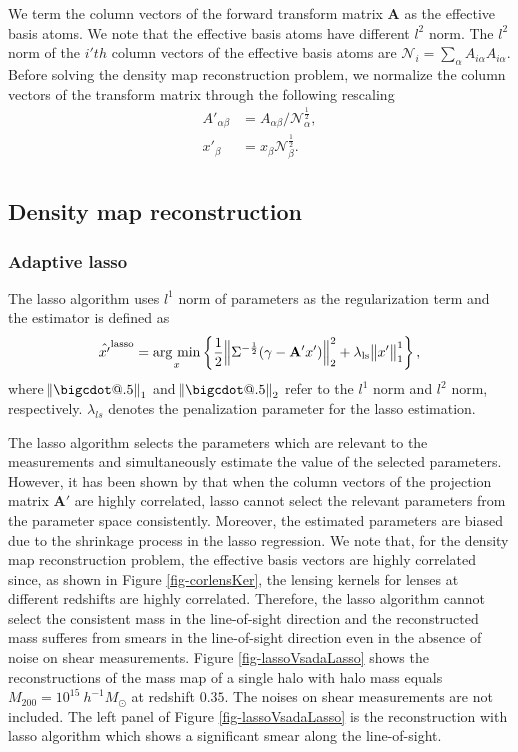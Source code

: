 \documentclass[twocolumn]{aastex62}
\makeatletter
\newcommand*\bigcdot{\mathpalette\bigcdot@{.5}}
\newcommand*\bigcdot@[2]{\mathbin{\vcenter{\hbox{\scalebox{#2}{$\m@th#1\bullet$}}}}}
\newcommand{\argmin}{\mathop{\rm arg~min}\limits}
\makeatother
\begin{document}
We term the column vectors of the forward transform matrix $\mathbf{A}$ as the effective basis atoms. We note that the 
effective basis atoms have different $l^2$ norm. The $l^2$ norm of the $i'th$ column vectors of the effective basis atoms are 
$\mathcal{N}_{i}=\sum_\alpha A_{i\alpha}A_{i\alpha}$. Before solving the density map reconstruction problem, we normalize 
the column
vectors of the transform matrix through the following rescaling
\begin{equation}
\begin{split}
A'_{\alpha\beta}&=A_{\alpha\beta}/\mathcal{N}_{\alpha}^{\frac{1}{2}},\\
x'_{\beta}&=x_{\beta}\mathcal{N}_{\beta}^{\frac{1}{2}}.\\
\end{split}
\end{equation}

\subsection{Density map reconstruction}
\label{subsec:method-reconstruction}

\subsubsection{Adaptive lasso}

The lasso algorithm uses $l^1$ norm of parameters as the regularization term and the estimator is defined as
\begin{equation}
\hat{x'}^{\rm{lasso}}=\argmin_{x} \left\{ \frac{1}{2}\norm{\Sigma^{-\frac{1}{2}}(\gamma- \mathbf{A'} x')}_2^2+ \lambda_{\rm{ls}} \norm{x'}^1_1\right\},
\end{equation}
where $\norm{\bigcdot}_1$ and $\norm{\bigcdot}_2$ refer to the $l^1$ norm and $l^2$ norm, respectively.
$\lambda_{ls}$ denotes the penalization parameter for the lasso estimation.

The lasso algorithm selects the parameters which are relevant to the measurements and simultaneously estimate the value of 
the selected parameters. However, it has been shown by 
\citet{AdaLASSO-Zou2006} that when the column vectors of the projection matrix $\mathbf{A'}$ are highly correlated, 
lasso cannot select the relevant parameters from the parameter space consistently. Moreover, the estimated parameters 
are biased due to the shrinkage process in the lasso regression. We note that, for the density map reconstruction problem, 
the effective basis vectors are highly correlated since, as shown in Figure \ref{fig-corlensKer}, the lensing kernels for 
lenses at different redshifts are highly correlated. Therefore, the lasso algorithm cannot select the consistent mass in  
the line-of-sight direction and the reconstructed mass sufferes from smears in the line-of-sight direction even in the 
absence of noise on shear measurements. 
Figure \ref{fig-lassoVsadaLasso} shows the reconstructions of the mass map of a single halo with halo mass equals 
$M_{200}=10^{15} ~h^{-1}M_{\odot}$ at redshift $0.35$. The noises on shear measurements are not included. The left panel of 
Figure \ref{fig-lassoVsadaLasso} is the reconstruction with lasso algorithm which shows a significant smear along the line-of-sight.
\end{document}
